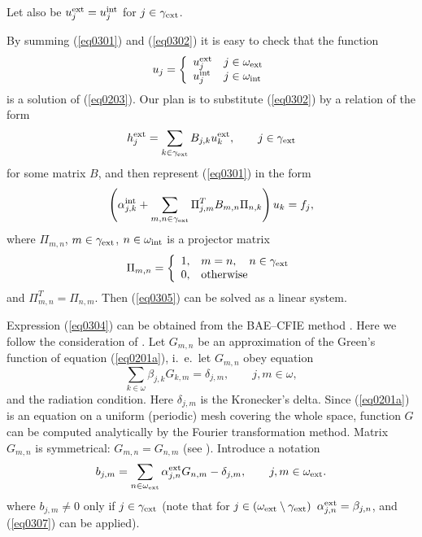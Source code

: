 \documentclass[12pt]{article}
\newcommand{\rin}{{\rm int}}
\newcommand{\rex}{{\rm ext}}
\begin{document}
Let also be $u^\rex_j = u^\rin_j$ for $j \in \gamma_\rex$.

By summing (\ref{eq0301}) and (\ref{eq0302})
it is easy to check that the function
\begin{equation}
u_j = \left\{ \begin{array}{ll}
u_j^\rex & j \in \omega_\rex \\
u_j^\rin & j \in \omega_\rin
\end{array}\right.
\label{eq0303}
\end{equation}
is a solution of (\ref{eq0203}). Our plan is to substitute (\ref{eq0302}) by a relation of the form
\begin{equation}
h^\rex_j = \sum_{k \in \gamma_\rex} B_{j,k} u^\rex_k ,
\qquad
j \in \gamma_\rex
\label{eq0304}
\end{equation}
for some matrix $B$, and then represent (\ref{eq0301}) in the form
\begin{equation}
\left( \alpha^\rin_{j,k} + \sum_{m,n \in \gamma_\rex}\Pi^T_{j,m}B_{m,n}\Pi_{n,k} \right) u_k = f_j,
\label{eq0305}
\end{equation}
where $\Pi_{m,n}$, $m \in \gamma_\rex$,  $n \in \omega_\rin$  is a projector matrix
\begin{equation}
\Pi_{m,n} = \left\{   \begin{array}{ll}
1, &  m=n,\quad n\in \gamma_\rex \\
0, &  \mbox{otherwise}
\end{array} \right.
\label{eq0306}
\end{equation}
and $\Pi^T_{m,n} = \Pi_{n,m}$. Then (\ref{eq0305}) can be solved as a linear system.

Expression (\ref{eq0304}) can be obtained from the BAE--CFIE method \cite{poblet-PVS:2015}.
Here we follow the consideration of \cite{poblet-PVS:2015}.
Let $G_{m,n}$ be an approximation of the Green's function of equation (\ref{eq0201a}), i.\ e.\ let
$G_{m,n}$
obey
equation
\begin{equation}
\sum_{k \in \omega}\beta_{j,k} G_{k,m} = \delta_{j,m},
\qquad
j,m \in \omega,
\label{eq0307}
\end{equation}
and the radiation condition. Here $\delta_{j, m}$ is the Kronecker's delta.
Since (\ref{eq0201a}) is an equation on a uniform (periodic) mesh covering the whole space, function $G$ can be computed analytically by the Fourier transformation method. Matrix $G_{m,n}$ is symmetrical:
$G_{m,n} = G_{n,m}$ (see \cite{poblet-PVS:2015}).
Introduce a notation
\begin{equation}
b_{j,m} =
\sum_{n \in \omega_\rex}
\alpha^\rex_{j,n} G_{n,m} - \delta_{j,m}  ,
\qquad
j,m \in \omega_\rex.
\label{eq0308a}
\end{equation}
where $b_{j,m} \ne 0$ only if $j \in \gamma_\rex$ (note that for $j \in (\omega_\rex \setminus \gamma_\rex)$
$\alpha^\rex_{j,n} = \beta_{j,n}$, and (\ref{eq0307}) can be applied).
\end{document}
